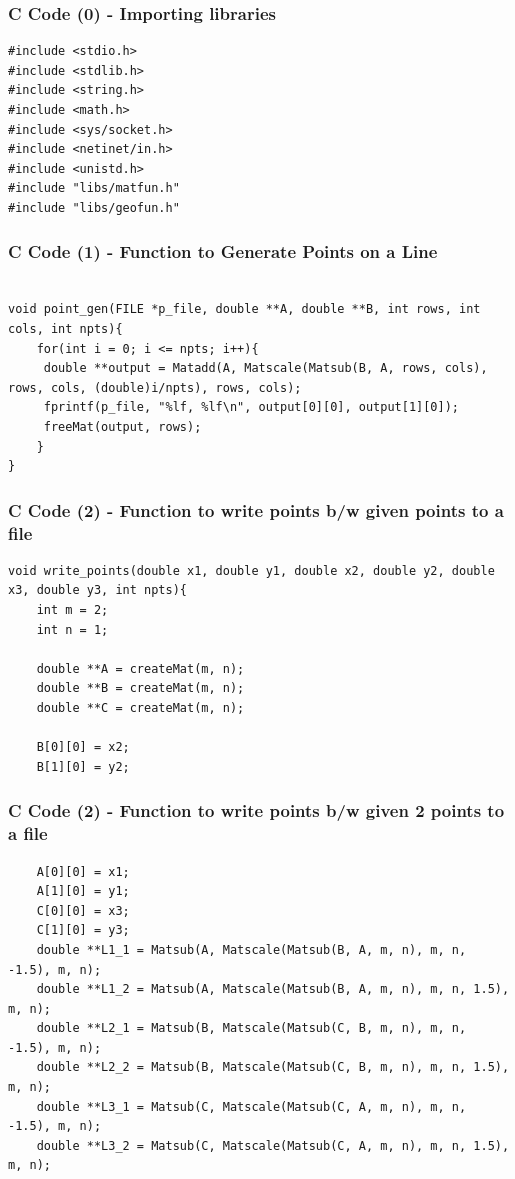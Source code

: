 \documentclass{beamer}
\begin{document}
\begin{frame}[fragile]
    \frametitle{C Code (0) - Importing libraries}

    \begin{lstlisting}
#include <stdio.h>
#include <stdlib.h>
#include <string.h>
#include <math.h>
#include <sys/socket.h>
#include <netinet/in.h>
#include <unistd.h>
#include "libs/matfun.h"
#include "libs/geofun.h"
    \end{lstlisting}
\end{frame}
\begin{frame}[fragile]
    \frametitle{C Code (1) - Function to Generate Points on a Line}

    \begin{lstlisting}

void point_gen(FILE *p_file, double **A, double **B, int rows, int cols, int npts){
    for(int i = 0; i <= npts; i++){
     double **output = Matadd(A, Matscale(Matsub(B, A, rows, cols), rows, cols, (double)i/npts), rows, cols);
     fprintf(p_file, "%lf, %lf\n", output[0][0], output[1][0]);
     freeMat(output, rows);
    }
}

    \end{lstlisting}
\end{frame}


\begin{frame}[fragile]
    \frametitle{C Code (2) - Function to write points b/w given points to a file}

    \begin{lstlisting}
void write_points(double x1, double y1, double x2, double y2, double x3, double y3, int npts){
    int m = 2;
    int n = 1;

    double **A = createMat(m, n);
    double **B = createMat(m, n);
    double **C = createMat(m, n);

    B[0][0] = x2;
    B[1][0] = y2;
    \end{lstlisting}
\end{frame}
\begin{frame}[fragile]
    \frametitle{C Code (2) - Function to write points b/w given 2 points to a file}

    \begin{lstlisting}
    A[0][0] = x1;
    A[1][0] = y1;
    C[0][0] = x3;
    C[1][0] = y3;
    double **L1_1 = Matsub(A, Matscale(Matsub(B, A, m, n), m, n, -1.5), m, n);
    double **L1_2 = Matsub(A, Matscale(Matsub(B, A, m, n), m, n, 1.5), m, n);
    double **L2_1 = Matsub(B, Matscale(Matsub(C, B, m, n), m, n, -1.5), m, n);
    double **L2_2 = Matsub(B, Matscale(Matsub(C, B, m, n), m, n, 1.5), m, n);
    double **L3_1 = Matsub(C, Matscale(Matsub(C, A, m, n), m, n, -1.5), m, n);
    double **L3_2 = Matsub(C, Matscale(Matsub(C, A, m, n), m, n, 1.5), m, n);
    \end{lstlisting}
\end{frame}
\end{document}
